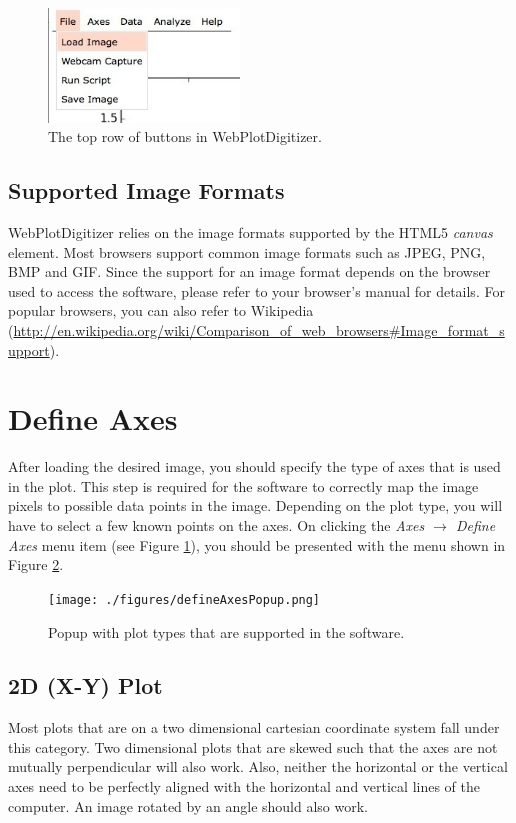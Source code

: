 \documentclass[letterpaper, 10pt]{article}
\begin{document}
\begin{figure}
\begin{center}
\includegraphics[width=2in]{./figures/fileMenu.jpg}
\caption{The top row of buttons in WebPlotDigitizer.}
\label{fig:topButtons}
\end{center}
\end{figure}

\subsection{Supported Image Formats}
WebPlotDigitizer relies on the image formats supported by the HTML5 \emph{canvas} element. Most browsers support common image formats such as JPEG, PNG, BMP and GIF. Since the support for an image format depends on the browser used to access the software, please refer to your browser's manual for details. For popular browsers, you can also refer to Wikipedia (\url{http://en.wikipedia.org/wiki/Comparison_of_web_browsers#Image_format_support}).


\section{Define Axes}

After loading the desired image, you should specify the type of axes that is used in the plot. This step is required for the software to correctly map the image pixels to possible data points in the image. Depending on the plot type, you will have to select a few known points on the axes. On clicking the \emph{Axes $\rightarrow$ Define Axes} menu item (see Figure \ref{fig:topButtons}), you should be presented with the menu shown in Figure \ref{fig:defineAxesPopup}.
\begin{figure}
\begin{center}
\texttt{[image: ./figures/defineAxesPopup.png]}
\caption{Popup with plot types that are supported in the software.}
\label{fig:defineAxesPopup}
\end{center}
\end{figure}

\subsection{2D (X-Y) Plot}
Most plots that are on a two dimensional cartesian coordinate system fall under this category. Two dimensional plots that are skewed such that the axes are not mutually perpendicular will also work. Also, neither the horizontal or the vertical axes need to be perfectly aligned with the horizontal and vertical lines of the computer. An image rotated by an angle should also work. 
\end{document}
